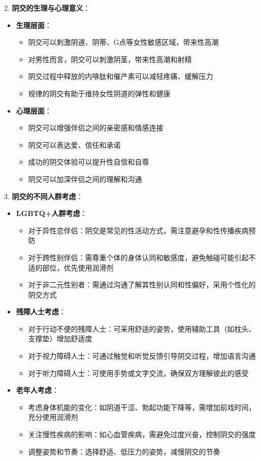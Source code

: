 \documentclass[12pt,UTF8]{ctexbook}
\begin{document}
2. \textbf{阴交的生理与心理意义}：
\begin{itemize}
	\item \textbf{生理层面}：
	\begin{itemize}
		\item 阴交可以刺激阴道、阴蒂、G点等女性敏感区域，带来性高潮
		\item 对男性而言，阴交可以刺激阴茎，带来性高潮和射精
		\item 阴交过程中释放的内啡肽和催产素可以减轻疼痛、缓解压力
		\item 规律的阴交有助于维持女性阴道的弹性和健康
	\end{itemize}
	\item \textbf{心理层面}：
	\begin{itemize}
		\item 阴交可以增强伴侣之间的亲密感和情感连接
		\item 阴交可以表达爱、信任和承诺
		\item 成功的阴交体验可以提升性自信和自尊
		\item 阴交可以加深伴侣之间的理解和沟通
	\end{itemize}
\end{itemize}

3. \textbf{阴交的不同人群考虑}：
\begin{itemize}
	\item \textbf{LGBTQ+人群考虑}：
	\begin{itemize}
		\item 对于异性恋伴侣：阴交是常见的性活动方式，需注意避孕和性传播疾病预防
		\item 对于跨性别伴侣：需尊重个体的身体认同和敏感度，避免触碰可能引起不适的部位，优先使用润滑剂
		\item 对于非二元性别者：需通过沟通了解其性别认同和性偏好，采用个性化的阴交方式
	\end{itemize}
	\item \textbf{残障人士考虑}：
	\begin{itemize}
		\item 对于行动不便的残障人士：可采用舒适的姿势，使用辅助工具（如枕头、支撑垫）增加舒适度
		\item 对于视力障碍人士：可通过触觉和听觉反馈引导阴交过程，增加语言沟通
		\item 对于听力障碍人士：可使用手势或文字交流，确保双方理解彼此的感受
	\end{itemize}
	\item \textbf{老年人考虑}：
	\begin{itemize}
		\item 考虑身体机能的变化：如阴道干涩、勃起功能下降等，需增加前戏时间，充分使用润滑剂
		\item 关注慢性疾病的影响：如心血管疾病，需避免过度兴奋，控制阴交的强度
		\item 调整姿势和节奏：选择舒适、低压力的姿势，减慢阴交的节奏
	\end{itemize}
\end{itemize}
\end{document}
